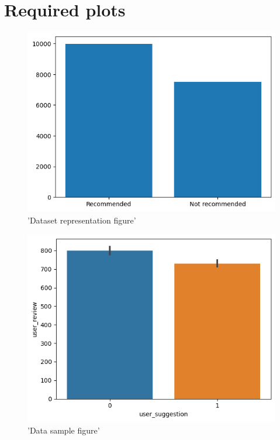 \documentclass[acmtog]{acmart}
\begin{document}
\clearpage
\section{Required plots}

\begin{figure}
\caption{'Dataset representation figure'}
\includegraphics[scale=0.5]{plt1}
\end{figure}

\begin{figure}
\caption{'Data sample figure'}
\includegraphics[scale=0.5]{plt2}
\end{figure}
\end{document}
